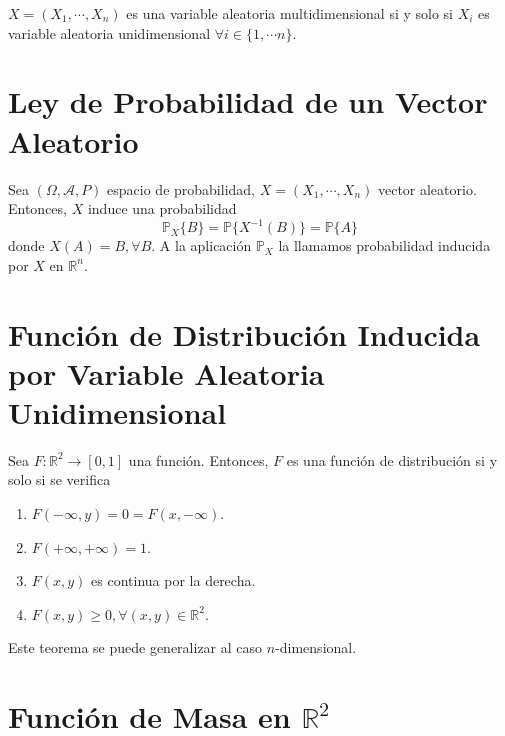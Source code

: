 \begin{theo}
  $X = (X_{1}, \cdots, X_{n}) $ es una variable aleatoria multidimensional si y solo si $X_{i}$ es variable aleatoria unidimensional $\forall i \in \{ 1, \cdots n \}$.
\end{theo}

\section{Ley de Probabilidad de un Vector Aleatorio}

\begin{prop}
  Sea $(\Omega, \mathcal{A}, P )$ espacio de probabilidad, $X = (X_{1}, \cdots, X_{n})$ vector aleatorio. Entonces, $X$ induce una probabilidad 
  \[ 
    \mathbb{P}_{X} \{ B \} = \mathbb{P} \{ X^{-1}(B) \} = \mathbb{P} \{ A \}
  \] 
  donde $X(A) = B, \forall B$. A la aplicación $\mathbb{P}_{X}$ la llamamos probabilidad inducida por $X$ en $\mathbb{R}^n$.
\end{prop}

\section{Función de Distribución Inducida por Variable Aleatoria Unidimensional}

\begin{theo}
  Sea $F : \mathbb{R}^{2} \to [0,1] $ una función. Entonces, $F$ es una función de distribución si y solo si se verifica
  \begin{enumerate}[label=(\roman*)]
    \item $F(-\infty, y) = 0 = F(x, -\infty) $.
    \item $F( + \infty, + \infty) = 1$.
    \item $F(x,y)$ es continua por la derecha.
    \item $F(x,y) \geq 0, \forall (x,y) \in \mathbb{R}^{2}$.
  \end{enumerate}
\end{theo}

\begin{obs}
  Este teorema se puede generalizar al caso $n$-dimensional.
\end{obs}

\section{Función de Masa en $\mathbb{R}^{2}$}

